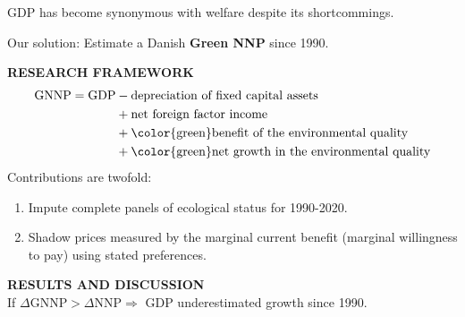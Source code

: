 \begin{frame}
  GDP has become synonymous with welfare despite its shortcommings.\par
  Our solution: Estimate a Danish \textbf{Green NNP} since 1990.
  \begin{tcolorbox}
    \textbf{RESEARCH FRAMEWORK}
    \begin{align*}
        \text{GNNP} = \text{GDP} &- \text{depreciation of fixed capital assets} \\
        &+ \text{net foreign factor income} \\
        &+ \text{\color{green}benefit of the environmental quality} \\
        &+ \text{\color{green}net growth in the environmental quality}
    \end{align*}
    Contributions are twofold:
    \begin{enumerate}
      \item Impute complete panels of ecological status for 1990-2020.
      \item Shadow prices measured by the marginal current benefit (marginal willingness to pay) using stated preferences.
    \end{enumerate}
  \end{tcolorbox}
  \textbf{RESULTS AND DISCUSSION}\\
  If $\Delta\text{GNNP}>\Delta\text{NNP}\Rightarrow$ GDP underestimated growth since 1990.
\end{frame}